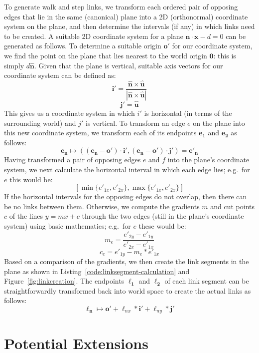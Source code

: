 \documentclass[10pt,twocolumn]{article}
\begin{document}
To generate walk and step links, we transform each ordered pair of opposing edges that lie in the same (canonical) plane into a 2D (orthonormal) coordinate system on the plane, and then determine the intervals (if any) in which links need to be created. A suitable 2D coordinate system for a plane $\mathbf{\hat{n}} \cdot \mathbf{x} - d = 0$ can be generated as follows. To determine a suitable origin $\mathbf{o'}$ for our coordinate system, we find the point on the plane that lies nearest to the world origin $\mathbf{0}$: this is simply $d\mathbf{\hat{n}}$. Given that the plane is vertical, suitable axis vectors for our coordinate system can be defined as:
%
\[
\mathbf{i'} = \frac{\mathbf{\hat{n}} \times \mathbf{\hat{u}}}{\left| \mathbf{\hat{n}} \times \mathbf{\hat{u}} \right|}
\]
\[
\mathbf{j'} = \mathbf{\hat{u}}
\]
%
This gives us a coordinate system in which $i'$ is horizontal (in terms of the surrounding world) and $j'$ is vertical. To transform an edge $e$ on the plane into this new coordinate system, we transform each of its endpoints $\mathbf{e_1}$ and $\mathbf{e_2}$ as follows:
%
\[
\mathbf{e_n} \mapsto ((\mathbf{e_n} - \mathbf{o'}) \cdot \mathbf{i'}, (\mathbf{e_n} - \mathbf{o'}) \cdot \mathbf{j'}) = \mathbf{e'_n}
\]
%
Having transformed a pair of opposing edges $e$ and $f$ into the plane's coordinate system, we next calculate the horizontal interval in which each edge lies; e.g.~for $e$ this would be:
%
\[
\left[ \min\{e'_{1x},e'_{2x}\}, \max\{e'_{1x},e'_{2x}\} \right]
\]
%
If the horizontal intervals for the opposing edges do not overlap, then there can be no links between them. Otherwise, we compute the gradients $m$ and cut points $c$ of the lines $y = mx + c$ through the two edges (still in the plane's coordinate system) using basic mathematics; e.g.~for $e$ these would be:
%
\[
m_e = \frac{e'_{2y} - e'_{1y}}{e'_{2x} - e'_{1x}}
\]
\[
c_e = e'_{1y} - m_e * e'_{1x}
\]
%
Based on a comparison of the gradients, we then create the link segments in the plane as shown in Listing~\ref{code:linksegment-calculation} and Figure~\ref{fig:linkcreation}. The endpoints $\mathbf{\ell_1}$ and $\mathbf{\ell_2}$ of each link segment can be straightforwardly transformed back into world space to create the actual links as follows:
%
\[
\mathbf{\ell_n} \mapsto \mathbf{o'} + \ell_{nx} * \mathbf{i'} + \ell_{ny} * \mathbf{j'}
\]

\section{Potential Extensions}
\end{document}
